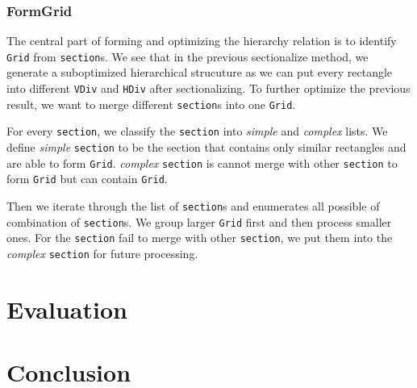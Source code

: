 \documentclass[runningheads]{llncs}
\begin{document}
\subsubsection{FormGrid} The central part of forming and optimizing the hierarchy relation is to identify \lstinline{Grid} from \lstinline{section}s. We see that in the previous sectionalize method, we generate a suboptimized hierarchical strucuture as we can put every rectangle into different \lstinline{VDiv} and \lstinline{HDiv} after sectionalizing. To further optimize the previous result, we want to merge different \lstinline{section}s into one \lstinline{Grid}.

For every \lstinline{section}, we classify the \lstinline{section} into \textit{simple} and \textit{complex} lists. We define \textit{simple} \lstinline{section} to be the section that contains only similar rectangles and are able to form \lstinline{Grid}. \textit{complex} \lstinline{section} is cannot merge with other \lstinline{section} to form \lstinline{Grid} but can contain \lstinline{Grid}. 

Then we iterate through the list of \lstinline{section}s and enumerates all possible of combination of \lstinline{section}s. We group larger \lstinline{Grid} first and then process smaller ones. For the \lstinline{section} fail to merge with other \lstinline{section}, we put them into the \textit{complex} \lstinline{section} for future processing.



\section{Evaluation}
\section{Conclusion}
\end{document}
